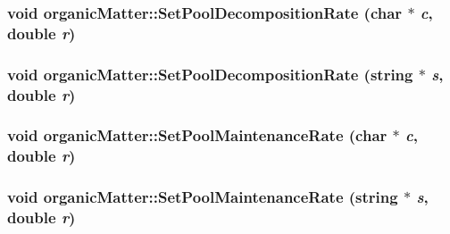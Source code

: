 \label{classorganic_matter_a9570bf4f0f840b7d661575d7bf62a964}
\hypertarget{classorganic_matter_a463254cfa0a5995d1d4e902f66a9f3ca}{
\subsubsection[{SetPoolDecompositionRate}]{\setlength{\rightskip}{0pt plus 5cm}void organicMatter::SetPoolDecompositionRate (char $\ast$ {\em c}, \/  double {\em r})}}
\label{classorganic_matter_a463254cfa0a5995d1d4e902f66a9f3ca}
\hypertarget{classorganic_matter_ad3f7859dfff063a1c3f44054a7d4ecf5}{
\subsubsection[{SetPoolDecompositionRate}]{\setlength{\rightskip}{0pt plus 5cm}void organicMatter::SetPoolDecompositionRate (string $\ast$ {\em s}, \/  double {\em r})}}
\label{classorganic_matter_ad3f7859dfff063a1c3f44054a7d4ecf5}
\hypertarget{classorganic_matter_a0e6a78d76c751e8d0f614938170cff20}{
\subsubsection[{SetPoolMaintenanceRate}]{\setlength{\rightskip}{0pt plus 5cm}void organicMatter::SetPoolMaintenanceRate (char $\ast$ {\em c}, \/  double {\em r})}}
\label{classorganic_matter_a0e6a78d76c751e8d0f614938170cff20}
\hypertarget{classorganic_matter_a4d0b7d6e7cf64fdfccff6d0f4004d6d1}{
\subsubsection[{SetPoolMaintenanceRate}]{\setlength{\rightskip}{0pt plus 5cm}void organicMatter::SetPoolMaintenanceRate (string $\ast$ {\em s}, \/  double {\em r})}}
